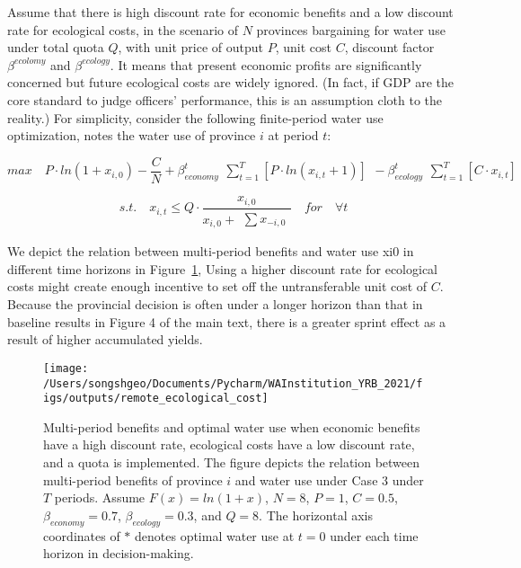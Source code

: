 \documentclass{article}
\begin{document}
Assume that there is high discount rate for economic benefits and a low discount rate for ecological costs, in the scenario of $N$ provinces bargaining for water use under total quota $Q$, with unit price of output $P$, unit cost $C$, discount factor $\beta^{ecolomy}$ and $\beta^{ecology}$. It means that present economic profits are significantly concerned but future ecological costs are widely ignored. (In fact, if GDP are the core standard to judge officers’ performance, this is an assumption cloth to the reality.) For simplicity, consider the following finite-period water use optimization, notes the water use of province $i$ at period $t$:

$$ max \quad P \cdot ln(1+x_{i,0})-\frac{C}{N}+\beta_{economy}^t \begin{matrix} \sum_{t=1}^T [P \cdot ln(x_{i,t}+1)]  \end{matrix} - \beta_{ecology}^t \begin{matrix} \sum_{t=1}^T [C \cdot x_{i,t}] \end{matrix}$$

$$s.t. \quad x_{i,t} \leq Q \cdot \frac{x_{i,0}}{x_{i,0} + \begin{matrix} \sum x_{-i,0} \end{matrix}} \quad for \quad \forall t$$

We depict the relation between multi-period benefits and water use xi0 in different time horizons in Figure~\ref{fig:remote_cost}, Using a higher discount rate for ecological costs might create enough incentive to set off the untransferable unit cost of $C$. Because the provincial decision is often under a longer horizon than that in baseline results in Figure 4 of the main text, there is a greater sprint effect as a result of higher accumulated yields.

\begin{figure}[h!]
	\centering
	\texttt{[image: /Users/songshgeo/Documents/Pycharm/WAInstitution\_YRB\_2021/figs/outputs/remote\_ecological\_cost]}
	\caption{Multi-period benefits and optimal water use when economic benefits have a high discount rate, ecological costs have a low discount rate, and a quota is implemented. The figure depicts the relation between multi-period benefits of province $i$ and water use under Case 3 under $T$ periods. Assume $F(x)=ln(1+x)$, $N=8$, $P=1$, $C=0.5$, $\beta_{economy}=0.7$, $\beta_{ecology}=0.3$, and $Q=8$. The horizontal axis coordinates of $*$ denotes optimal water use at $t=0$ under each time horizon in decision-making.
	}
	\label{fig:remote_cost}
\end{figure}


\end{document}

